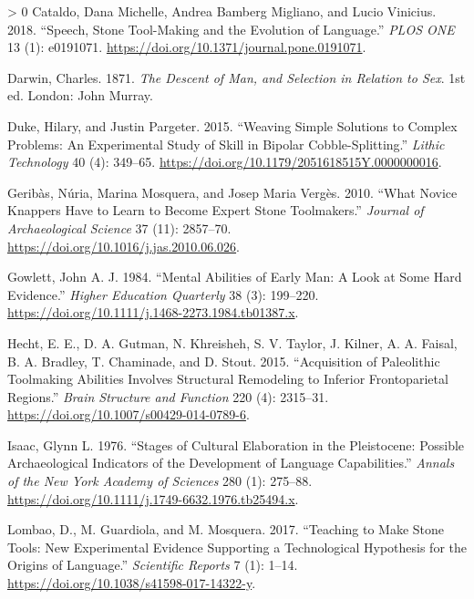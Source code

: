 \documentclass[smallextended]{svjour3}       %
\newlength{\cslhangindent}
\newenvironment{CSLReferences}[3] %
 {%
  \setlength{\parindent}{0pt}
  \ifodd #1 \everypar{\setlength{\hangindent}{\cslhangindent}}\ignorespaces\fi
  \ifnum #2 > 0
  \setlength{\parskip}{#3\baselineskip}
  \fi
 }%
 {}
\begin{document}
\hypertarget{refs}{}
\begin{CSLReferences}{1}{0}
\leavevmode\hypertarget{ref-cataldo2018}{}%
Cataldo, Dana Michelle, Andrea Bamberg Migliano, and Lucio Vinicius.
2018. {``Speech, Stone Tool-Making and the Evolution of Language.''}
\emph{PLOS ONE} 13 (1): e0191071.
\url{https://doi.org/10.1371/journal.pone.0191071}.

\leavevmode\hypertarget{ref-darwin1871}{}%
Darwin, Charles. 1871. \emph{The Descent of Man, and Selection in
Relation to Sex}. 1st ed. London: John Murray.

\leavevmode\hypertarget{ref-duke2015}{}%
Duke, Hilary, and Justin Pargeter. 2015. {``Weaving Simple Solutions to
Complex Problems: An Experimental Study of Skill in Bipolar
Cobble-Splitting.''} \emph{Lithic Technology} 40 (4): 349--65.
\url{https://doi.org/10.1179/2051618515Y.0000000016}.

\leavevmode\hypertarget{ref-geribuxe0s2010}{}%
Geribàs, Núria, Marina Mosquera, and Josep Maria Vergès. 2010. {``What
Novice Knappers Have to Learn to Become Expert Stone Toolmakers.''}
\emph{Journal of Archaeological Science} 37 (11): 2857--70.
\url{https://doi.org/10.1016/j.jas.2010.06.026}.

\leavevmode\hypertarget{ref-gowlett1984}{}%
Gowlett, John A. J. 1984. {``Mental Abilities of Early Man: A Look at
Some Hard Evidence.''} \emph{Higher Education Quarterly} 38 (3):
199--220. \url{https://doi.org/10.1111/j.1468-2273.1984.tb01387.x}.

\leavevmode\hypertarget{ref-hecht2015}{}%
Hecht, E. E., D. A. Gutman, N. Khreisheh, S. V. Taylor, J. Kilner, A. A.
Faisal, B. A. Bradley, T. Chaminade, and D. Stout. 2015. {``Acquisition
of Paleolithic Toolmaking Abilities Involves Structural Remodeling to
Inferior Frontoparietal Regions.''} \emph{Brain Structure and Function}
220 (4): 2315--31. \url{https://doi.org/10.1007/s00429-014-0789-6}.

\leavevmode\hypertarget{ref-isaac1976}{}%
Isaac, Glynn L. 1976. {``Stages of Cultural Elaboration in the
Pleistocene: Possible Archaeological Indicators of the Development of
Language Capabilities.''} \emph{Annals of the New York Academy of
Sciences} 280 (1): 275--88.
\url{https://doi.org/10.1111/j.1749-6632.1976.tb25494.x}.

\leavevmode\hypertarget{ref-lombao2017}{}%
Lombao, D., M. Guardiola, and M. Mosquera. 2017. {``Teaching to Make
Stone Tools: New Experimental Evidence Supporting a Technological
Hypothesis for the Origins of Language.''} \emph{Scientific Reports} 7
(1): 1--14. \url{https://doi.org/10.1038/s41598-017-14322-y}.


\end{CSLReferences}
\end{document}
